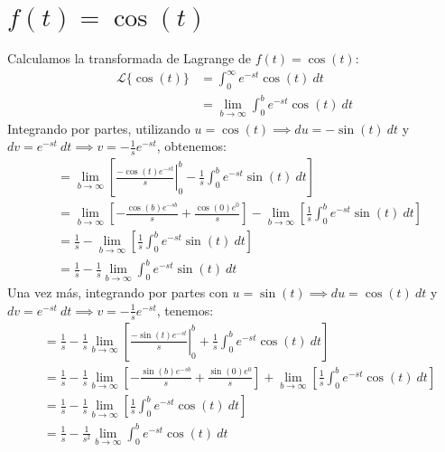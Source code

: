 \documentclass[12pt, a4paper]{article}
\begin{document}
\sffamily


\newpage

\setcounter{section}{7}
\section{\texorpdfstring{\(f(t)=\cos(t)\)}{f (t) = cos (t)}}

Calculamos la transformada de Lagrange de \(f(t) = \cos(t)\):
\begin{align*}
	\mathcal{L}\{\cos (t)\} &= \int_{0}^{\infty} e^{-st} \cos(t)\ dt \\
	&= \lim_{b \to \infty} \int_{0}^{b} e^{-st} \cos(t)\ dt
\end{align*}
Integrando por partes, utilizando \(u = \cos(t) \implies du = -\sin(t)\ dt\) y \(dv = e^{-st}\ dt \implies v = -\frac{1}{s} e^{-st}\), obtenemos:
\begin{align*}
	&= \lim_{b \to \infty} \left[ \left. \frac{-\cos (t) e^{-st}}{s} \right|_{0}^{b} - \frac{1}{s} \int_{0}^{b} e^{-st} \sin (t) \ dt \right] \\
	&= \lim_{b \to \infty} \left[ - \frac{\cos (b) e^{-sb}}{s} + \frac{\cos (0) e^{0}}{s} \right] - \lim_{b \to \infty} \left[ \frac{1}{s} \int_{0}^{b} e^{-st} \sin (t) \ dt \right] \\
	&= \frac{1}{s} - \lim_{b \to \infty} \left[ \frac{1}{s} \int_{0}^{b} e^{-st} \sin (t) \ dt \right] \\
	&= \frac{1}{s} - \frac{1}{s} \lim_{b \to \infty} \int_{0}^{b} e^{-st} \sin (t) \ dt
\end{align*}
Una vez más, integrando por partes con \(u = \sin (t) \implies du = \cos (t)\ dt\) y \(dv = e^{-st}\ dt \implies v = -\frac{1}{s} e^{-st}\), tenemos:
\begin{align*}
	&= \frac{1}{s} - \frac{1}{s} \lim_{b \to \infty} \left[ \left. \frac{-\sin (t) e^{-st}}{s} \right|_{0}^{b} + \frac{1}{s} \int_{0}^{b} e^{-st} \cos (t)\ dt \right] \\
	&= \frac{1}{s} - \frac{1}{s} \lim_{b \to \infty} \left[ - \frac{\sin (b) e^{-sb}}{s} + \frac{\sin (0) e^{0}}{s} \right] + \lim_{b \to \infty} \left[ \frac{1}{s} \int_{0}^{b} e^{-st} \cos (t)\ dt \right] \\
	&= \frac{1}{s} - \frac{1}{s} \lim_{b \to \infty} \left[ \frac{1}{s} \int_{0}^{b} e^{-st} \cos (t)\ dt \right] \\
	&= \frac{1}{s} - \frac{1}{s^{2}} \lim_{b \to \infty} \int_{0}^{b} e^{-st} \cos (t) \ dt
\end{align*}
\end{document}
